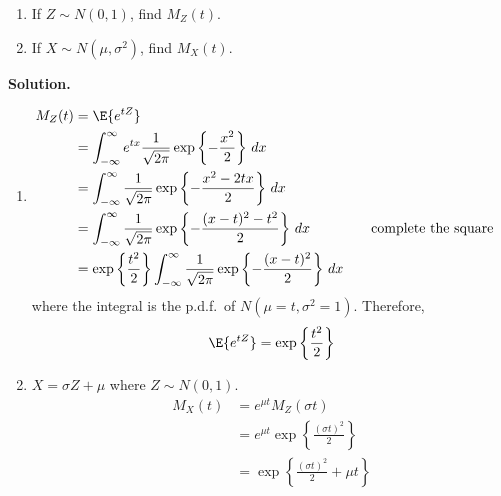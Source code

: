 \begin{Example}{}{}
    \begin{enumerate}[label=(\roman*)]
        \item If $ Z \sim N(0,1) $, find $ M_Z(t) $.
        \item If $ X \sim N(\mu,\sigma^2) $, find $ M_X(t) $.
    \end{enumerate}
    \textbf{Solution.}
    \begin{enumerate}[label=(\roman*)]
        \item \begin{align*}
                  M_Z(t)
                                                                     & =\E{e^{tZ}}                                                                        \\
                                                                     & =\int_{-\infty}^{\infty} e^{tx} \frac{1}{\sqrt{2\pi}}
                  \exp\left\{ -\frac{x^2}{2} \right\} \, d{x}                                                                                             \\
                                                                     & =\int_{-\infty}^{\infty} \frac{1}{\sqrt{2\pi}}
                  \exp\left\{ -\frac{x^2-2tx}{2} \right\} \, d{x}                                                                                         \\
                                                                     & =\int_{-\infty}^{\infty} \frac{1}{\sqrt{2\pi}}
                  \exp\left\{ -\frac{(x-t)^2-t^2}{2}\right\} \, d{x} & \quad                                                 & \text{complete the square} \\
                                                                     & =\exp\left\{ \frac{t^2}{2}\right\}
                  \int_{-\infty}^{\infty} \frac{1}{\sqrt{2\pi}}
                  \exp\left\{ -\frac{(x-t)^2}{2} \right\} \, d{x}
              \end{align*}
              where the integral is the p.d.f.\ of $ N(\mu=t,\sigma^2=1) $. Therefore,
              \[ \E{e^{tZ}}=\exp\left\{ \frac{t^2}{2}\right\} \]

        \item $ X=\sigma Z+\mu $ where $ Z \sim N(0,1) $.
              \begin{align*}
                  M_X(t)
                   & =e^{\mu t}M_Z(\sigma t)                                            \\
                   & =e^{\mu t}\exp\left\{ \frac{\left( \sigma t \right)^2}{2} \right\} \\
                   & =\exp\left\{ \frac{(\sigma t)^2}{2} +\mu t\right\}
              \end{align*}
    \end{enumerate}
\end{Example}

